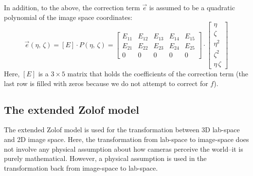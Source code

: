 \documentclass[10pt,a4paper]{article}
\begin{document}
In addition, to the above, the correction term $\vec{e}$ is assumed to be a quadratic polynomial of the image space coordinates:
%
\begin{equation}
\vec{e}(\eta,\,\zeta) = [E]\cdot P(\eta,\,\zeta) =
\begin{bmatrix}
E_{11} & E_{12} & E_{13} & E_{14} & E_{15}\\
E_{21} & E_{22} & E_{23} & E_{24} & E_{25}\\
0 & 0 & 0 & 0 & 0
\end{bmatrix}
\cdot 
\begin{bmatrix}
\eta\\
\zeta\\
\eta^2\\
\zeta^2\\
\eta\,\zeta
\end{bmatrix}
\end{equation}
%
Here, $[E]$ is a $3\times5$ matrix that holds the coefficients of the correction term (the last row is filled with zeros because we do not attempt to correct for $f$).











\subsection{The extended Zolof model} 



The extended Zolof model is used for the transformation between 3D lab-space and 2D image space. 
Here, the transformation from lab-space to image-space does not involve any physical assumption about how cameras perceive the world--it is purely mathematical. However, a physical assumption is used in the transformation back from image-space to lab-space. 
\end{document}
